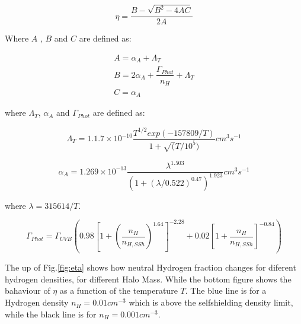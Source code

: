 \documentclass[12pt]{article}
\begin{document}
\begin{equation}
\eta = \dfrac{B - \sqrt{B^2 - 4AC}}{2A}
\end{equation}

Where $A$ , $B$ and $C$ are defined as: 

\begin{equation}
\begin{split}
A = \alpha_A + \Lambda_T \\
B = 2\alpha_A + \dfrac{\Gamma_{Phot}}{n_H} + \Lambda_T \\
C = \alpha_A
\end{split}
\end{equation}

where $\Lambda_T$, $\alpha_A$ and $\Gamma_{Phot}$ are defined as:

\begin{equation}
\Lambda_T = 1.1.7 \times 10 ^{-10} \dfrac{T^{1/2} exp(-157809/T)}{1 + \sqrt(T/10^5)} cm^3 s^{-1}
\end{equation}


\begin{equation}
\alpha_A = 1.269 \times 10 ^{-13} \dfrac{\lambda^{1.503}}{(1 + (\lambda / 0.522)^{0.47} )^{1.923}} cm^{3} s^{-1}
\end{equation}

where $\lambda = 315614 / T$. 

\begin{equation}
\Gamma_{Phot} = \Gamma_{UVB} \left(  0.98\left[ 1 + \left( \dfrac{n_H}{n_{H, SSh}} \right)^{1.64}  \right]^{-2.28} + 0.02 \left[ 1 + \dfrac{n_H}{n_{H,SSh}} \right]^{-0.84}   \right) 
\end{equation}

The up of Fig.\ref{fig:eta} shows how neutral Hydrogen fraction changes for diferent hydrogen densities, 
for different Halo Mass.
While the bottom figure shows the bahaviour of $\eta$ as a function of the temperature $T$. The blue 
line is for a Hydrogen density $n_H = 0.01 cm^{-3}$ which is above the selfshielding density limit, 
while the black line is for $n_H  = 0.001 cm^{-3}$.
\end{document}
